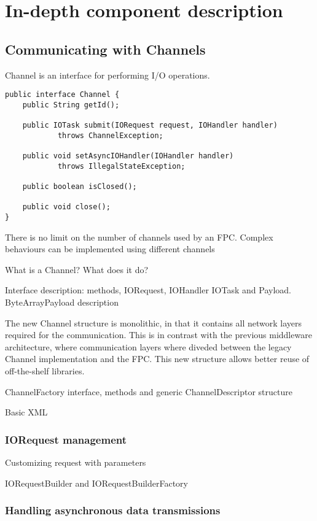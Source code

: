 \chapter{In-depth component description}

\section{Communicating with Channels}

Channel is an interface for performing I/O operations.


\lstset{language=Java}
\begin{lstlisting}[caption=The Channel interface]
public interface Channel {
	public String getId();
	
	public IOTask submit(IORequest request, IOHandler handler)
			throws ChannelException;
	
	public void setAsyncIOHandler(IOHandler handler)
			throws IllegalStateException;
			
	public boolean isClosed();
	
	public void close();		
}
\end{lstlisting}

There is no limit on the number of channels used by an FPC. Complex behaviours can be implemented using different channels

What is a Channel? What does it do?

Interface description: methods, IORequest, IOHandler IOTask and Payload.
ByteArrayPayload description

The new Channel structure is monolithic, in that it contains all network layers required for the communication. This is in contrast with the previous middleware architecture, where communication layers where diveded between the legacy Channel implementation and the FPC. This new structure allows better reuse of off-the-shelf libraries.

ChannelFactory interface, methods and generic ChannelDescriptor structure

Basic XML 

\subsection{IORequest management}

Customizing request with parameters

IORequestBuilder and IORequestBuilderFactory

\subsection{Handling asynchronous data transmissions}

